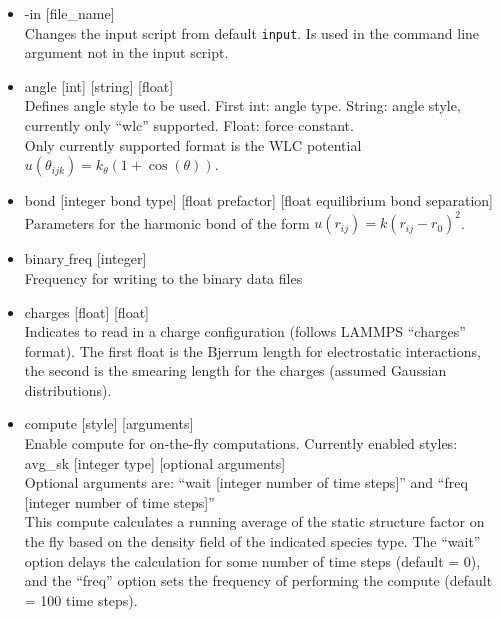 \documentclass[12pt]{article}
\begin{document}
\begin{itemize}
  \item
    -in [file\_name]
    \\[8pt]
	Changes the input script from default \verb+input+. Is used in the command line argument not in the input script.

  \item
    angle [int] [string] [float]
    \\[8pt]
    Defines angle style to be used. First int: angle type. String: angle style, currently only ``wlc'' supported. Float: force constant. 
    \\
    Only currently supported format is the WLC potential $u(\theta_{ijk} ) = k_\theta (1+\cos(\theta))$.



  \item
    bond [integer bond type] [float prefactor] [float equilibrium bond separation]
    \\[8pt]
    Parameters for the harmonic bond of the form $u(r_{ij}) = k (r_{ij}-r_0)^2$.
    



    
    \item
    binary$\_$freq [integer]
    \\[8pt]
    Frequency for writing to the binary data files
        
    \item
    charges [float] [float]
    \\[8pt]
    Indicates to read in a charge configuration (follows LAMMPS ``charges'' format). The first float is the Bjerrum length for electrostatic interactions, the second is the smearing length for the charges (assumed Gaussian distributions).
    
    
    \item 
    compute [style] [arguments]
    \\[8pt]
    Enable compute for on-the-fly computations. Currently enabled styles:
    \\[8pt]
    avg\_sk [integer type] [optional arguments]
    \\[8pt] 
    Optional arguments are: ``wait [integer number of time steps]'' and  ``freq [integer number of time steps]''
    \\[8pt]
    This compute calculates a running average of the static structure factor on the fly based on the density field of the indicated species type. The ``wait'' option delays the calculation for some number of time steps (default = 0), and the ``freq'' option sets the frequency of performing the compute (default = 100 time steps).
    

\end{itemize}
\end{document}
